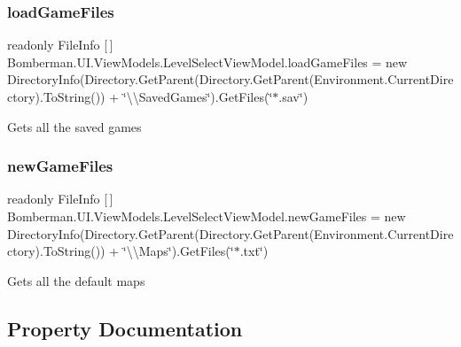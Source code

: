 \subsubsection{\texorpdfstring{loadGameFiles}{loadGameFiles}}
{\footnotesize\ttfamily readonly File\+Info \mbox{[}$\,$\mbox{]} Bomberman.\+U\+I.\+View\+Models.\+Level\+Select\+View\+Model.\+load\+Game\+Files = new Directory\+Info(Directory.\+Get\+Parent(Directory.\+Get\+Parent(Environment.\+Current\+Directory).To\+String()) + \char`\"{}\textbackslash{}\textbackslash{}Saved\+Games\char`\"{}).Get\+Files(\char`\"{}$\ast$.sav\char`\"{})\hspace{0.3cm}{\ttfamily [private]}}



Gets all the saved games 

\mbox{\label{class_bomberman_1_1_u_i_1_1_view_models_1_1_level_select_view_model_a35f10c80061120480536163aeb128580}} 
\subsubsection{\texorpdfstring{newGameFiles}{newGameFiles}}
{\footnotesize\ttfamily readonly File\+Info \mbox{[}$\,$\mbox{]} Bomberman.\+U\+I.\+View\+Models.\+Level\+Select\+View\+Model.\+new\+Game\+Files = new Directory\+Info(Directory.\+Get\+Parent(Directory.\+Get\+Parent(Environment.\+Current\+Directory).To\+String()) + \char`\"{}\textbackslash{}\textbackslash{}Maps\char`\"{}).Get\+Files(\char`\"{}$\ast$.txt\char`\"{})\hspace{0.3cm}{\ttfamily [private]}}



Gets all the default maps 



\subsection{Property Documentation}
\mbox{\label{class_bomberman_1_1_u_i_1_1_view_models_1_1_level_select_view_model_acbbf1a8ae6d24c858f979e86145655ef}} 
